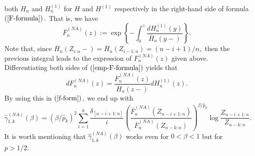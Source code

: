 \documentclass[reqno,openbib,runningheads,a4paper,12pt]{amsart}%
\begin{document}
both $H_{n}$ and $H_{n}^{\left(  1\right)  }$ for $H$ and $H^{\left(
1\right)  }$ respectively in the right-hand side of formula $\left(
\ref{F-formula}\right)  .$ That is, we have
\begin{equation}
\overline{F}_{n}^{\left(  NA\right)  }\left(  z\right)  :=\exp\left\{
-\int_{0}^{z}\frac{dH_{n}^{\left(  1\right)  }\left(  y\right)  }{\overline
{H}_{n}\left(  y-\right)  }\right\}  . \label{emp-F-formula}%
\end{equation}
Note that, since $\overline{H}_{n}\left(  Z_{i:n}-\right)  =\overline{H}%
_{n}\left(  Z_{i-1:n}\right)  =\left(  n-i+1\right)  /n,$ then the previous
integral leads to the expression of $F_{n}^{\left(  NA\right)  }\left(
z\right)  $ given above. Differentiating both sides of $\left(
\ref{emp-F-formula}\right)  $ yields that%
\[
dF_{n}^{\left(  NA\right)  }\left(  z\right)  =\frac{\overline{F}_{n}^{\left(
NA\right)  }\left(  z\right)  }{\overline{H}_{n}\left(  z-\right)  }%
dH_{n}^{\left(  1\right)  }\left(  z\right)  .
\]
By using this in $\left(  \ref{f-form}\right)  ,$ we end up with%
\[
\widehat{\gamma}_{1,k}^{\left(  NA\right)  }\left(  \beta\right)  =\left(
\beta/\widehat{p}_{k}\right)  ^{2}\sum_{i=1}^{k}\frac{\delta_{\left[
n-i+1:n\right]  }}{i}\left(  \frac{\overline{F}_{n}^{\left(  NA\right)
}\left(  Z_{n-i+1:n}\right)  }{\overline{F}_{n}^{\left(  NA\right)  }\left(
Z_{n-k:n}\right)  }\right)  ^{\beta/\widehat{p}_{k}}\log\frac{Z_{n-i+1:n}%
}{Z_{n-k:n}}.
\]
It is worth mentioning that $\widehat{\gamma}_{1,k}^{\left(  NA\right)
}\left(  \beta\right)  $ works even for $0<\beta<1$ but for $p>1/2.$\medskip
\end{document}

